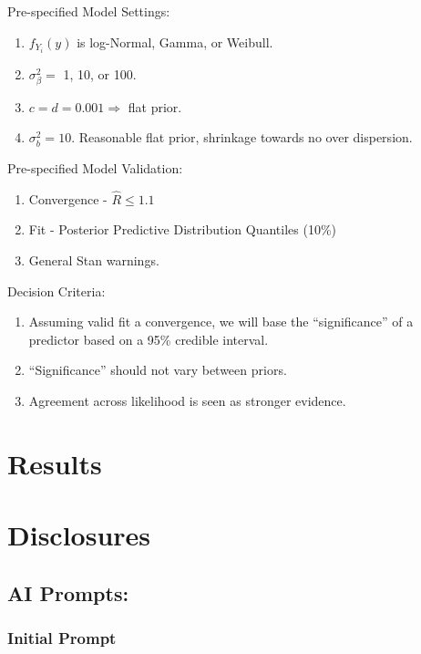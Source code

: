 \documentclass[
  letterpaper,
]{article}
\begin{document}
Pre-specified Model Settings:

\begin{enumerate}
\def\labelenumi{\arabic{enumi}.}
\item
  \(f_{Y_i}(y)\) is log-Normal, Gamma, or Weibull.
\item
  \(\sigma^2_\beta=\) 1, 10, or 100.
\item
  \(c = d = 0.001 \Rightarrow\) flat prior.
\item
  \(\sigma^2_b = 10\). Reasonable flat prior, shrinkage towards no over
  dispersion.
\end{enumerate}

Pre-specified Model Validation:

\begin{enumerate}
\def\labelenumi{\arabic{enumi}.}
\item
  Convergence - \(\hat R \leq 1.1\)
\item
  Fit - Posterior Predictive Distribution Quantiles (10\%)
\item
  General Stan warnings.
\end{enumerate}

Decision Criteria:

\begin{enumerate}
\def\labelenumi{\arabic{enumi}.}
\item
  Assuming valid fit a convergence, we will base the ``significance'' of
  a predictor based on a 95\% credible interval.
\item
  ``Significance'' should not vary between priors.
\item
  Agreement across likelihood is seen as stronger evidence.
\end{enumerate}

\section{Results}\label{results}

\pagebreak

\section{Disclosures}\label{disclosures}

\subsection{AI Prompts:}\label{ai-prompts}

\subsubsection{Initial Prompt}\label{initial-prompt}
\end{document}
